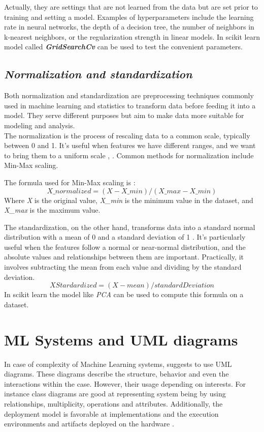 \documentclass[12pt,a4paper, oneside]{book}
\begin{document}
Actually, they are settings that are not learned from the data but are set prior to training and setting a model. Examples of hyperparameters include the learning rate in neural networks, the depth of a decision tree, the number of neighbors in k-nearest neighbors, or the regularization strength in linear models. In scikit learn model called \textit{\textbf{GridSearchCv}} can be used to test the convenient parameters. 

\subsection*{\textit{Normalization and standardization}} 
Both normalization and standardization are preprocessing techniques commonly used in machine learning and statistics to transform data before feeding it into a model. They serve different purposes but aim to make data more suitable for modeling and analysis. \\

The normalization is the process of rescaling data to a common scale, typically between 0 and 1. It's useful when features we have different ranges, and we want to bring them to a uniform scale \citep{ali2014data}, \citep{elen2021standardized}. Common methods for normalization include Min-Max scaling. 

The formula used for Min-Max scaling is : 
\begin{equation}
	X\_normalized = (X-X\_min)/(X\_max - X\_min)
\end{equation} 
Where \textit{X} is the original value, \textit{X\_min} is the minimum value in the dataset, and \textit{X\_max} is the maximum value.

The standardization, on the other hand, transforms data into a standard normal distribution with a mean of 0 and a standard deviation of 1 \citep{ali2014data}. It's particularly useful when the features follow a normal or near-normal distribution, and the absolute values and relationships between them are important. Practically, it involves subtracting the mean from each value and dividing by the standard deviation. 
\begin{equation}
	XStardardized = (X - mean) / standardDeviation
\end{equation}
In scikit learn the model like \textit{PCA} can be used to compute this formula on a dataset.
\section{ML Systems and UML diagrams}
In case of complexity of Machine Learning systems, \citet{mlwithpython} suggests to use UML diagrams. These diagrams describe the structure, behavior and even the interactions within the case\citep{eriksson2003uml}. However, their usage depending on interests. For instance class diagrams are good at representing system being by using relationships, multiplicity, operations and attributes. Additionally, the deployment model is favorable at implementations and the execution environments and artifacts deployed on the hardware \citep{umlOverView}.  
\end{document}
